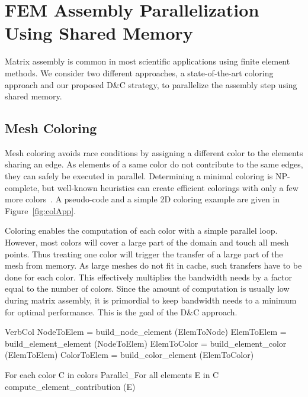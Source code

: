 \documentclass[10pt]{IOS-Book-Article}
\begin{document}
\section{FEM Assembly Parallelization Using Shared Memory}
\label{sec:assembly}

Matrix assembly is common in most scientific applications using finite element methods. 
We consider two different approaches, a state-of-the-art coloring approach and our
proposed D\&C strategy, to parallelize the assembly step using shared memory.


\subsection{Mesh Coloring}
\label{sec:col}
Mesh coloring avoids race conditions by assigning a different color to the elements sharing an edge.
As elements of a same color do not contribute to the same edges, they can safely be executed in parallel.
Determining a minimal coloring is NP-complete, but well-known heuristics can create efficient colorings
with only a few more colors~\cite{CPUfe}.
A pseudo-code and a simple 2D coloring example are given in Figure~\ref{fig:colApp}.

Coloring enables the computation of each color with a simple parallel loop.
However, most colors will cover a large part of the domain and touch all mesh 
points. Thus treating one color will trigger the transfer of a large part
of the mesh from memory. As large meshes do not fit in cache, such transfers
have to be done for each color. This effectively multiplies the bandwidth needs by
a factor equal to the number of colors. Since the amount of computation is
usually low during matrix assembly, it is primordial to keep bandwidth needs
to a minimum for optimal performance. This is the goal of the D\&C approach.

\begin{SaveVerbatim}[]{VerbCol}
NodeToElem = build_node_element (ElemToNode)
ElemToElem = build_element_element (NodeToElem)
ElemToColor = build_element_color (ElemToElem)
ColorToElem = build_color_element (ElemToColor)

For each color C in colors
  Parallel_For all elements E in C
    compute_element_contribution (E)
\end{SaveVerbatim}
\end{document}
